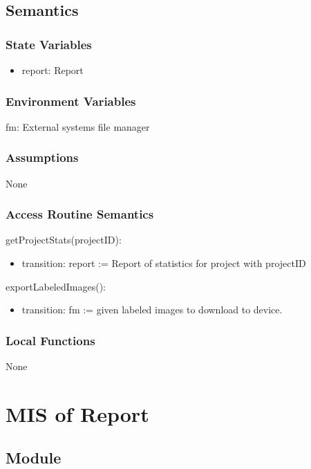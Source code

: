 \documentclass[12pt, titlepage]{article}
\begin{document}
\subsection{Semantics}

\subsubsection{State Variables}
\begin{itemize}
    \item report: Report
\end{itemize}

\subsubsection{Environment Variables}
fm: External systems file manager

\subsubsection{Assumptions}
None

\subsubsection{Access Routine Semantics}

\noindent getProjectStats(projectID):
\begin{itemize}
\item transition: report := Report of statistics for project with projectID
\end{itemize}

\noindent exportLabeledImages():
\begin{itemize}
\item transition: fm := given labeled images to download to device.
\end{itemize}

\subsubsection{Local Functions}
None

\section{MIS of Report} \label{report}

\subsection{Module}
\end{document}
